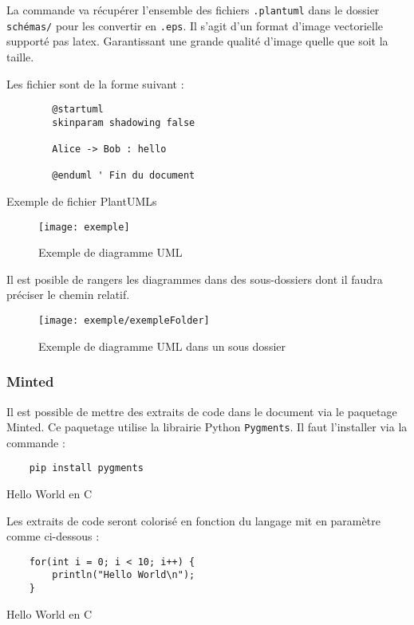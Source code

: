La commande va récupérer l'ensemble des fichiers \verb=.plantuml=
dans le dossier \verb=schémas/= pour les convertir en \verb=.eps=.
Il s'agit d'un format d'image vectorielle supporté pas \gls{latex}.
Garantissant une grande qualité d'image quelle que soit la taille.

Les fichier sont de la forme suivant :
\begin{code}
    \begin{verbatim}
        @startuml
        skinparam shadowing false

        Alice -> Bob : hello

        @enduml ' Fin du document
    \end{verbatim}
    \caption{Exemple de fichier PlantUMLs}
\end{code}

\begin{figure}[H]
    \centering
    \texttt{[image: exemple]}
    \caption{Exemple de diagramme UML}
\end{figure}

Il est posible de rangers les diagrammes dans des sous-dossiers dont il faudra préciser le chemin relatif.
\begin{figure}[H]
    \centering
    \texttt{[image: exemple/exempleFolder]}
    \caption{Exemple de diagramme UML dans un sous dossier }
\end{figure}

\subsubsection{Minted}
Il est possible de mettre des extraits de code dans le document via le paquetage Minted.
Ce paquetage utilise la librairie Python \verb=Pygments=. Il faut l'installer via la commande :
\begin{code}
    \begin{verbatim}
    pip install pygments
\end{verbatim}
    \caption{Hello World en C}
\end{code}

Les extraits de code seront colorisé en fonction du langage mit en paramètre comme ci-dessous :

\begin{code}
    \begin{verbatim}
    for(int i = 0; i < 10; i++) {
        println("Hello World\n");
    }
\end{verbatim}
    \caption{Hello World en C}
\end{code}

